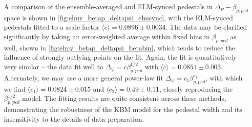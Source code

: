 A comparison of the ensemble-averaged and ELM-synced pedestals in $\Delta_\psi - \beta_{p,ped}$ space is shown in \cref{fig:elmy_betap_deltapsi_elmsync}, with the ELM-synced pedestals fitted to a scale factor $\langle c \rangle = 0.0896 \pm 0.0034$.  The data may be clarified significantly by taking an error-weighted average within fixed bins in $\beta_{p,ped}$ as well, shown in \cref{fig:elmy_betap_deltapsi_betabin}, which tends to reduce the influence of strongly-outlying points on the fit.  Again, the fit is quantitatively very similar -- the data fit well to $\Delta_\psi = c \beta_{p,ped}^{1/2}$ with $\langle c \rangle = 0.0851 \pm 0.003$.  Alternately, we may use a more general power-law fit $\Delta_\psi = c_1 \beta_{p,ped}^{c_2}$, with which we find $\langle c_1 \rangle = 0.0824 \pm 0.015$ and $\langle c_2 \rangle = 0.49 \pm 0.11$, closely reproducing the $\beta_{p,ped}^{1/2}$ model.  The fitting results are quite consistent across these methods, demonstrating the robustness of the KBM model for the pedestal width and its insensitivity to the details of data preparation.

\begin{figure}[t]
 \pushtooutside
\end{figure}

